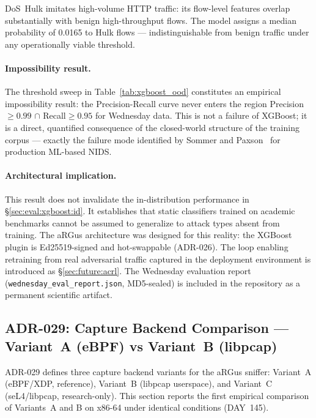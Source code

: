 \documentclass[11pt,a4paper]{article}
\begin{document}
    DoS~Hulk imitates high-volume HTTP traffic: its flow-level features overlap substantially
    with benign high-throughput flows. The model assigns a median probability of 0.0165 to
    Hulk flows --- indistinguishable from benign traffic under any operationally viable
    threshold.

    \paragraph{Impossibility result.}
    The threshold sweep in Table~\ref{tab:xgboost_ood} constitutes an empirical impossibility
    result: the Precision-Recall curve never enters the region
    Precision$\geq0.99$ $\cap$ Recall$\geq0.95$ for Wednesday data.
    This is not a failure of XGBoost; it is a direct, quantified consequence of the
    closed-world structure of the training corpus --- exactly the failure mode identified
    by Sommer and Paxson~\cite{sommer2010} for production ML-based NIDS.

    \paragraph{Architectural implication.}
    This result does not invalidate the in-distribution performance in
    \S\ref{sec:eval:xgboost:id}. It establishes that static classifiers trained on
    academic benchmarks cannot be assumed to generalize to attack types absent from
    training. The aRGus architecture was designed for this reality: the XGBoost plugin
    is Ed25519-signed and hot-swappable (ADR-026). The loop enabling retraining from
    real adversarial traffic captured in the deployment environment is introduced as
    \S\ref{sec:future:acrl}. The Wednesday evaluation report
    (\texttt{wednesday\_eval\_report.json}, MD5-sealed) is included in the repository
    as a permanent scientific artifact.

    \subsection{ADR-029: Capture Backend Comparison --- Variant~A (eBPF) vs Variant~B (libpcap)}
    \label{sec:eval:adr029}

    ADR-029 defines three capture backend variants for the aRGus sniffer:
    Variant~A (eBPF/XDP, reference), Variant~B (libpcap userspace), and
    Variant~C (seL4/libpcap, research-only). This section reports the first
    empirical comparison of Variants~A and B on x86-64 under identical
    conditions (DAY~145).
\end{document}
